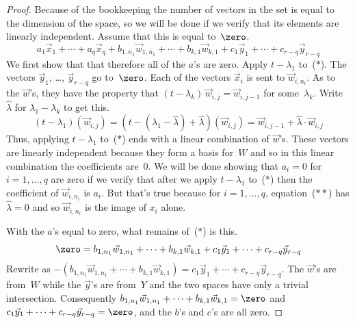 \begin{proof}
Because of the bookkeeping the number of vectors in the set
is equal to the dimension of the space, so 
we will be done if we verify that its elements are linearly independent.
Assume that this is equal to~$\zero$.
\begin{equation*}
  a_1\vec{x}_1+\cdots+a_q\vec{x}_q   
    +b_{1,n_1}\vec{w}_{1,n_1}+\cdots+b_{k,1}\vec{w}_{k,1} 
    +c_1\vec{y}_1+\cdots+c_{r-q}\vec{y}_{r-q}
  \tag{$*$}
\end{equation*}
We first show that that therefore
all of the $a$'s are zero.
Apply $t-\lambda_1$ to~($*$).
The vectors $\vec{y}_1$, \ldots, $\vec{y}_{r-q}$ 
go to~$\zero$.
Each of the vectors $\vec{x}_i$ is sent to 
$\vec{w}_{i,n_i}$.
As to the $\vec{w}$'s, they have the property that
$(t-\lambda_k)\,\vec{w}_{i,j}=\vec{w}_{i,j-1}$ 
for some~$\lambda_k$.
Write $\hat{\lambda}$ for $\lambda_1-\lambda_k$ to get this.
\begin{equation*}
  (t-\lambda_1)(\vec{w}_{i,j})
    =(t-(\lambda_1-\hat{\lambda})+\hat{\lambda})(\vec{w}_{i,j})
    =\vec{w}_{i,j-1}+\hat{\lambda}\cdot\vec{w}_{i,j} 
  \tag{$**$}
\end{equation*}
Thus, applying $t-\lambda_1$ to~($*$) ends with a 
linear combination of $\vec{w}$'s.
These vectors are linearly independent because
they form a basis for~$W$ and so in this linear combination 
the coefficients are~$0$.
We will be done showing that $a_i=0$ for $i=1,\ldots,q$ are zero if
we verify that after we apply $t-\lambda_1$ to~($*$) then
the coefficient of $\vec{w}_{i,n_i}$ is $a_i$.
But that's true because for $i=1,\ldots,q$, 
equation~($**$) has $\hat{\lambda}=0$
and so $\vec{w}_{i,n_i}$ is the image of $x_{i}$ alone.

With the $a$'s equal to zero, what remains of~($*$) is this.
\begin{equation*}
  \zero
  =
    b_{1,n_1}\vec{w}_{1,n_1}+\cdots+b_{k,1}\vec{w}_{k,1}
    +c_1\vec{y}_1+\cdots+c_{r-q}\vec{y}_{r-q}
\end{equation*}
Rewrite as $-(b_{1,n_1}\vec{w}_{1,n_1}+\cdots+b_{k,1}\vec{w}_{k,1})=
    c_1\vec{y}_1+\cdots+c_{r-q}\vec{y}_{r-q}$.
The $\vec{w}$'s are from~$W$ while the $\vec{y}$'s are from~$Y$ and the
two spaces have only a trivial intersection.
Consequently $b_{1,n_1}\vec{w}_{1,n_1}+\cdots+b_{k,1}\vec{w}_{k,1}=\zero$
and $c_1\vec{y}_1+\cdots+c_{r-q}\vec{y}_{r-q}=\zero$,
and the $b$'s and $c$'s are all zero.
\end{proof}




